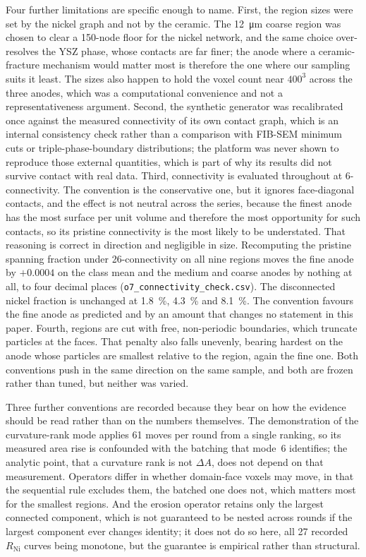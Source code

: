 \documentclass[5p,times,twocolumn]{elsarticle}
\newcommand{\Rni}{R_{\mathrm{Ni}}}
\begin{document}
Four further limitations are specific enough to name. First, the region sizes
were set by the nickel graph and not by the ceramic. The \SI{12}{\micro\metre}
coarse region was chosen to clear a 150-node floor for the nickel network, and
the same choice over-resolves the YSZ phase, whose contacts are far finer; the
anode where a ceramic-fracture mechanism would matter most is therefore the one
where our sampling suits it least. The sizes also happen to hold the voxel
count near $400^3$ across the three anodes, which was a computational
convenience and not a representativeness argument. Second, the synthetic
generator was recalibrated once against the measured connectivity of its own
contact graph, which is an internal consistency check rather than a comparison
with FIB-SEM minimum cuts or triple-phase-boundary distributions; the platform
was never shown to reproduce those external quantities, which is part of why
its results did not survive contact with real data. Third, connectivity is
evaluated throughout at 6-connectivity. The convention is the conservative one, but it ignores face-diagonal
contacts, and the effect is not neutral across the
series, because the finest anode has the most surface per unit volume and
therefore the
most opportunity for such contacts, so its pristine connectivity is the most
likely to be understated. That reasoning is correct in direction and negligible
in size. Recomputing the pristine spanning fraction under 26-connectivity on
all nine regions moves the fine anode by $+0.0004$ on the class mean and the
medium and coarse anodes by nothing at all, to four decimal places
(\texttt{o7\_connectivity\_check.csv}). The disconnected nickel fraction is
unchanged at \SI{1.8}{\percent}, \SI{4.3}{\percent} and \SI{8.1}{\percent}. The
convention favours the fine anode as predicted and by an amount that changes no
statement in this paper. Fourth, regions are cut with free, non-periodic boundaries, which
truncate particles at the faces. That penalty also falls unevenly, bearing
hardest on the anode whose particles are smallest relative to the region, again
the fine one. Both conventions push in the same direction on the same sample,
and both are frozen rather than tuned, but neither was varied.

Three further conventions are recorded because they bear on how the evidence
should be read rather than on the numbers themselves. The demonstration of the
curvature-rank mode applies \num{61} moves per round from a single ranking, so
its measured area rise is confounded with the batching that mode~6 identifies;
the analytic point, that a curvature rank is not $\Delta A$, does not depend on
that measurement. Operators differ in whether domain-face voxels may move, in
that the
sequential rule excludes them, the batched one does not, which matters most for
the smallest regions. And the erosion operator retains only the largest
connected component, which is not guaranteed to be nested across rounds if the
largest component ever changes identity; it does not do so here, all 27
recorded $\Rni$ curves being monotone, but the guarantee is empirical rather
than structural.
\end{document}
